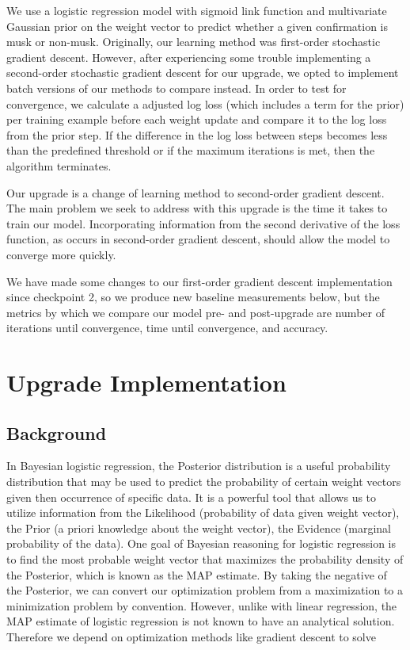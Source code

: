 \documentclass[11pt]{extarticle}
\begin{document}
We use a logistic regression model with sigmoid link function and multivariate Gaussian prior on the weight vector to predict whether a given confirmation is musk or non-musk. Originally, our learning method was first-order stochastic gradient descent. However, after experiencing some trouble implementing a second-order stochastic gradient descent for our upgrade, we opted to implement batch versions of our methods to compare instead. In order to test for convergence, we calculate a adjusted log loss (which includes a term for the prior) per training example before each weight update and compare it to the log loss from the prior step. If the difference in the log loss between steps becomes less than the predefined threshold or if the maximum iterations is met, then the algorithm terminates.

Our upgrade is a change of learning method to second-order gradient descent. The main problem we seek to address with this upgrade is the time it takes to train our model. Incorporating information from the second derivative of the loss function, as occurs in second-order gradient descent, should allow the model to converge more quickly.

We have made some changes to our first-order gradient descent implementation since checkpoint 2, so we produce new baseline measurements below, but the metrics by which we compare our model pre- and post-upgrade are number of iterations until convergence, time until convergence, and accuracy.

\newpage

\section{Upgrade Implementation}

\subsection{Background}

In Bayesian logistic regression, the Posterior distribution is a useful probability distribution that may be used to predict the probability of certain weight vectors given then occurrence of specific data. It is a powerful tool that allows us to utilize information from the Likelihood (probability of data given weight vector), the Prior (a priori knowledge about the weight vector), the Evidence (marginal probability of the data). One goal of Bayesian reasoning for logistic regression is to find the most probable weight vector that maximizes the probability density of the Posterior, which is known as the MAP estimate. By taking the negative of the Posterior, we can convert our optimization problem from a maximization to a minimization problem by convention. However, unlike with linear regression, the MAP estimate of logistic regression is not known to have an analytical solution. Therefore we depend on optimization methods like gradient descent to solve
\end{document}

